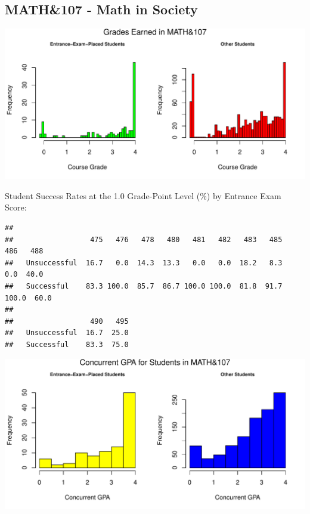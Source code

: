 \documentclass[twoside]{article}\usepackage[]{graphicx}\usepackage[]{color}
\makeatletter
\def\maxwidth{ %
  \ifdim\Gin@nat@width>\linewidth
    \linewidth
  \else
    \Gin@nat@width
  \fi
}
\newenvironment{kframe}{%
 \def\at@end@of@kframe{}%
 \ifinner\ifhmode%
  \def\at@end@of@kframe{\end{minipage}}%
  \begin{minipage}{\columnwidth}%
 \fi\fi%
 \def\FrameCommand##1{\hskip\@totalleftmargin \hskip-\fboxsep
 \colorbox{shadecolor}{##1}\hskip-\fboxsep
     \hskip-\linewidth \hskip-\@totalleftmargin \hskip\columnwidth}%
 \MakeFramed {\advance\hsize-\width
   \@totalleftmargin\z@ \linewidth\hsize
   \@setminipage}}%
 {\par\unskip\endMakeFramed%
 \at@end@of@kframe}
\newenvironment{knitrout}{}{} %
\makeatother
\begin{document}
\newpage
\subsection{MATH\&107 - Math in Society}

\begin{knitrout}
\color{fgcolor}
\includegraphics[width=\maxwidth]{figure/graphs107-1} 

\end{knitrout}


Student Success Rates  at the 1.0 Grade-Point Level (\%) by Entrance Exam Score:

\begin{knitrout}
\color{fgcolor}\begin{kframe}
\begin{verbatim}
##               
##                  475   476   478   480   481   482   483   485   486   488
##   Unsuccessful  16.7   0.0  14.3  13.3   0.0   0.0  18.2   8.3   0.0  40.0
##   Successful    83.3 100.0  85.7  86.7 100.0 100.0  81.8  91.7 100.0  60.0
##               
##                  490   495
##   Unsuccessful  16.7  25.0
##   Successful    83.3  75.0
\end{verbatim}
\end{kframe}
\end{knitrout}


\begin{knitrout}
\color{fgcolor}
\includegraphics[width=\maxwidth]{figure/GPAgraphs107-1} 

\end{knitrout}
\end{document}
